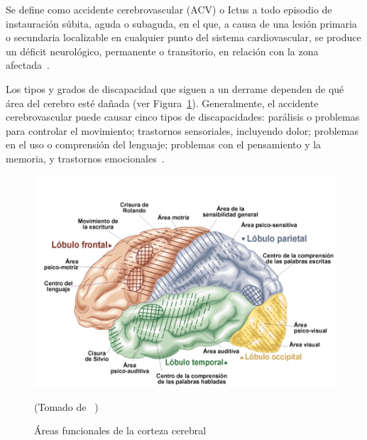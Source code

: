 
Se define como accidente cerebrovascular (ACV) o Ictus a todo episodio de instauración súbita, aguda o subaguda, en el que, a causa de una lesión primaria o secundaria localizable en cualquier punto del sistema cardiovascular, se produce un déficit neurológico, permanente o transitorio, en relación con la zona afectada~\cite{ictus}.

Los tipos y grados de discapacidad que siguen a un derrame dependen de qué área del cerebro esté dañada (ver Figura~\ref{fig: cerebralcortex}). Generalmente, el accidente cerebrovascular puede causar cinco tipos de discapacidades: parálisis o problemas para controlar el movimiento; trastornos sensoriales, incluyendo dolor; problemas en el uso o comprensión del lenguaje; problemas con el pensamiento y la memoria, y trastornos emocionales~\cite{post-strok}. 

\begin{figure}[ht]
    \centering
    \includegraphics[scale=0.5]{images/brain.jpg}
    \caption{Áreas funcionales de la corteza cerebral}
    (Tomado de ~\cite{areacereabral})
    \label{fig: cerebralcortex}
\end{figure}

